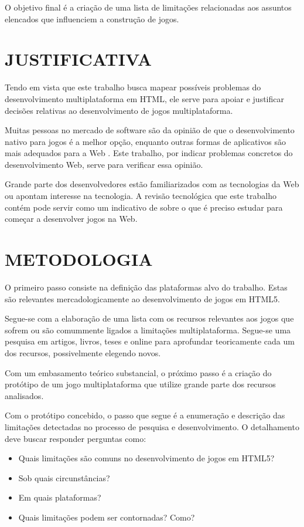 O objetivo final é a criação de uma lista de limitações relacionadas
aos assuntos elencados que influenciem a construção de jogos.

\section{JUSTIFICATIVA}

Tendo em vista que este trabalho busca mapear possíveis problemas
do desenvolvimento multiplataforma em HTML, ele serve para apoiar
e justificar decisões relativas ao desenvolvimento de jogos
multiplataforma.

Muitas pessoas no mercado de software são da opinião de que o
desenvolvimento nativo para jogos é a melhor opção, enquanto outras
formas de aplicativos são mais adequados para a Web \citet[p.
21]{aSeriousContender}. Este trabalho, por indicar problemas concretos
do desenvolvimento Web, serve para verificar essa opinião.

Grande parte dos desenvolvedores estão familiarizados com as
tecnologias da Web ou apontam interesse na tecnologia. A revisão
tecnológica que este trabalho contém pode servir como um indicativo
de sobre o que é preciso estudar para começar a desenvolver jogos na
Web.

\section{METODOLOGIA}
\thispagestyle{myheadings}

O primeiro passo consiste na definição das plataformas alvo do
trabalho. Estas são relevantes mercadologicamente ao desenvolvimento de
jogos em HTML5.

Segue-se com a elaboração de uma lista com os recursos relevantes
aos jogos que sofrem ou são comummente ligados a limitações
multiplataforma. Segue-se uma pesquisa em artigos, livros, teses e
online para aprofundar teoricamente cada um dos recursos, possivelmente
elegendo novos.

Com um embasamento teórico substancial, o próximo passo é a criação
do protótipo de um jogo multiplataforma que utilize grande parte dos
recursos analisados.

Com o protótipo concebido, o passo que segue é a enumeração e
descrição das limitações detectadas no processo de pesquisa e
desenvolvimento. O detalhamento deve buscar responder perguntas como:

\begin{itemize}
\item Quais limitações são comuns no desenvolvimento de jogos em HTML5?
\item Sob quais circunstâncias?
\item Em quais plataformas?
\item Quais limitações podem ser contornadas? Como?
\end{itemize}

